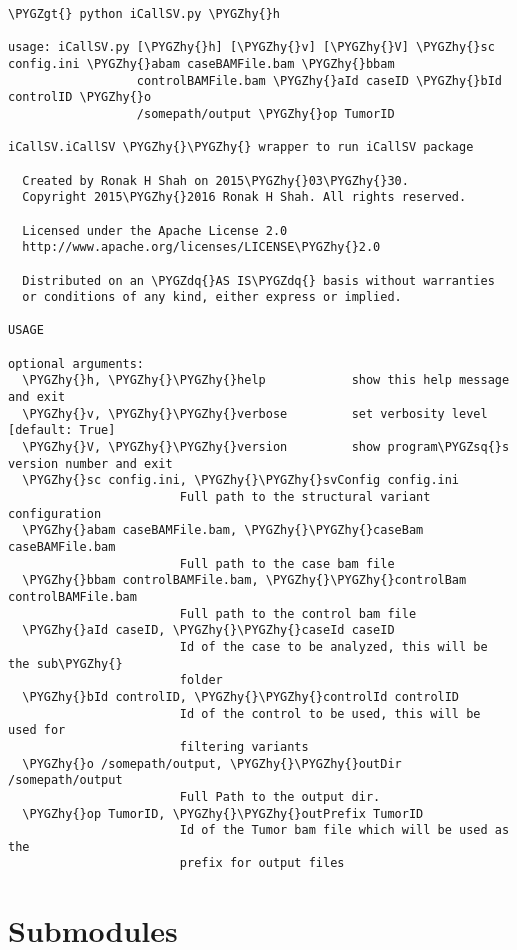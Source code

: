\documentclass[letterpaper,10pt,english]{sphinxmanual}
\def\PYGZgt{\char`\>}
\def\PYGZhy{\char`\-}
\def\PYGZsq{\char`\'}
\def\PYGZdq{\char`\"}
\renewcommand\PYGZsq{\textquotesingle}
\begin{document}
\begin{Verbatim}[commandchars=\\\{\}]
\PYGZgt{} python iCallSV.py \PYGZhy{}h

usage: iCallSV.py [\PYGZhy{}h] [\PYGZhy{}v] [\PYGZhy{}V] \PYGZhy{}sc config.ini \PYGZhy{}abam caseBAMFile.bam \PYGZhy{}bbam
                  controlBAMFile.bam \PYGZhy{}aId caseID \PYGZhy{}bId controlID \PYGZhy{}o
                  /somepath/output \PYGZhy{}op TumorID

iCallSV.iCallSV \PYGZhy{}\PYGZhy{} wrapper to run iCallSV package

  Created by Ronak H Shah on 2015\PYGZhy{}03\PYGZhy{}30.
  Copyright 2015\PYGZhy{}2016 Ronak H Shah. All rights reserved.

  Licensed under the Apache License 2.0
  http://www.apache.org/licenses/LICENSE\PYGZhy{}2.0

  Distributed on an \PYGZdq{}AS IS\PYGZdq{} basis without warranties
  or conditions of any kind, either express or implied.

USAGE

optional arguments:
  \PYGZhy{}h, \PYGZhy{}\PYGZhy{}help            show this help message and exit
  \PYGZhy{}v, \PYGZhy{}\PYGZhy{}verbose         set verbosity level [default: True]
  \PYGZhy{}V, \PYGZhy{}\PYGZhy{}version         show program\PYGZsq{}s version number and exit
  \PYGZhy{}sc config.ini, \PYGZhy{}\PYGZhy{}svConfig config.ini
                        Full path to the structural variant configuration
  \PYGZhy{}abam caseBAMFile.bam, \PYGZhy{}\PYGZhy{}caseBam caseBAMFile.bam
                        Full path to the case bam file
  \PYGZhy{}bbam controlBAMFile.bam, \PYGZhy{}\PYGZhy{}controlBam controlBAMFile.bam
                        Full path to the control bam file
  \PYGZhy{}aId caseID, \PYGZhy{}\PYGZhy{}caseId caseID
                        Id of the case to be analyzed, this will be the sub\PYGZhy{}
                        folder
  \PYGZhy{}bId controlID, \PYGZhy{}\PYGZhy{}controlId controlID
                        Id of the control to be used, this will be used for
                        filtering variants
  \PYGZhy{}o /somepath/output, \PYGZhy{}\PYGZhy{}outDir /somepath/output
                        Full Path to the output dir.
  \PYGZhy{}op TumorID, \PYGZhy{}\PYGZhy{}outPrefix TumorID
                        Id of the Tumor bam file which will be used as the
                        prefix for output files
\end{Verbatim}


\section{Submodules}
\label{iCallSV:submodules}
\end{document}
